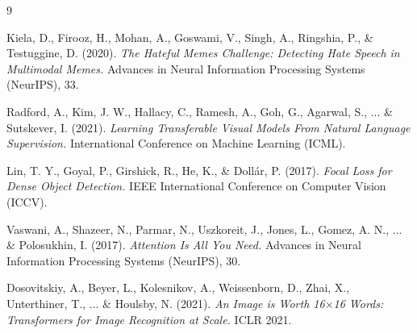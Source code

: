 \documentclass[12pt,a4paper]{article}
\begin{document}
\begin{thebibliography}{9}

Kiela, D., Firooz, H., Mohan, A., Goswami, V., Singh, A., Ringshia, P., \& Testuggine, D. (2020).
\textit{The Hateful Memes Challenge: Detecting Hate Speech in Multimodal Memes.}
Advances in Neural Information Processing Systems (NeurIPS), 33.

Radford, A., Kim, J. W., Hallacy, C., Ramesh, A., Goh, G., Agarwal, S., ... \& Sutskever, I. (2021).
\textit{Learning Transferable Visual Models From Natural Language Supervision.}
International Conference on Machine Learning (ICML).

Lin, T. Y., Goyal, P., Girshick, R., He, K., \& Dollár, P. (2017).
\textit{Focal Loss for Dense Object Detection.}
IEEE International Conference on Computer Vision (ICCV).

Vaswani, A., Shazeer, N., Parmar, N., Uszkoreit, J., Jones, L., Gomez, A. N., ... \& Polosukhin, I. (2017).
\textit{Attention Is All You Need.}
Advances in Neural Information Processing Systems (NeurIPS), 30.

Dosovitskiy, A., Beyer, L., Kolesnikov, A., Weissenborn, D., Zhai, X., Unterthiner, T., ... \& Houlsby, N. (2021).
\textit{An Image is Worth 16$\times$16 Words: Transformers for Image Recognition at Scale.}
ICLR 2021.

\end{thebibliography}
\end{document}
